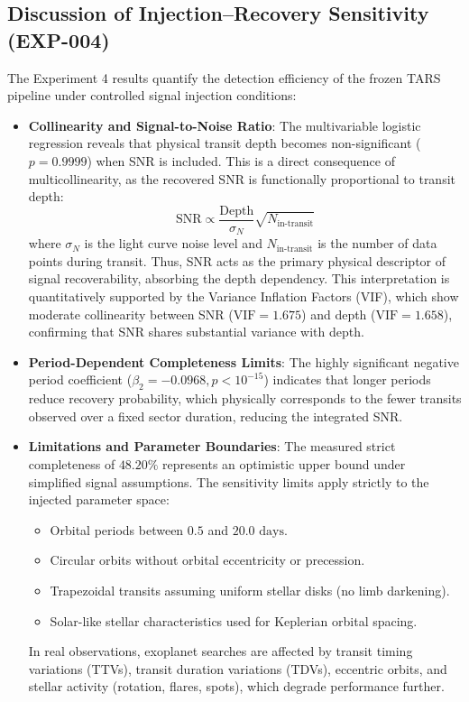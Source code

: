 \subsection{Discussion of Injection--Recovery Sensitivity (EXP-004)} \label{sec:disc_exp4}
The Experiment 4 results quantify the detection efficiency of the frozen TARS pipeline under controlled signal injection conditions:
\begin{itemize}
    \item \textbf{Collinearity and Signal-to-Noise Ratio}: The multivariable logistic regression reveals that physical transit depth becomes non-significant ($p = 0.9999$) when SNR is included. This is a direct consequence of multicollinearity, as the recovered SNR is functionally proportional to transit depth:
    \begin{equation}
    \text{SNR} \propto \frac{\text{Depth}}{\sigma_N} \sqrt{N_{\text{in-transit}}}
    \end{equation}
    where $\sigma_N$ is the light curve noise level and $N_{\text{in-transit}}$ is the number of data points during transit. Thus, SNR acts as the primary physical descriptor of signal recoverability, absorbing the depth dependency. This interpretation is quantitatively supported by the Variance Inflation Factors (VIF), which show moderate collinearity between SNR ($\text{VIF} = 1.675$) and depth ($\text{VIF} = 1.658$), confirming that SNR shares substantial variance with depth.
    \item \textbf{Period-Dependent Completeness Limits}: The highly significant negative period coefficient ($\beta_2 = -0.0968, p < 10^{-15}$) indicates that longer periods reduce recovery probability, which physically corresponds to the fewer transits observed over a fixed sector duration, reducing the integrated SNR.
    \item \textbf{Limitations and Parameter Boundaries}: The measured strict completeness of $48.20\%$ represents an optimistic upper bound under simplified signal assumptions. The sensitivity limits apply strictly to the injected parameter space:
        \begin{itemize}
            \item Orbital periods between $0.5$ and $20.0\text{ days}$.
            \item Circular orbits without orbital eccentricity or precession.
            \item Trapezoidal transits assuming uniform stellar disks (no limb darkening).
            \item Solar-like stellar characteristics used for Keplerian orbital spacing.
        \end{itemize}
        In real observations, exoplanet searches are affected by transit timing variations (TTVs), transit duration variations (TDVs), eccentric orbits, and stellar activity (rotation, flares, spots), which degrade performance further.
\end{itemize}

